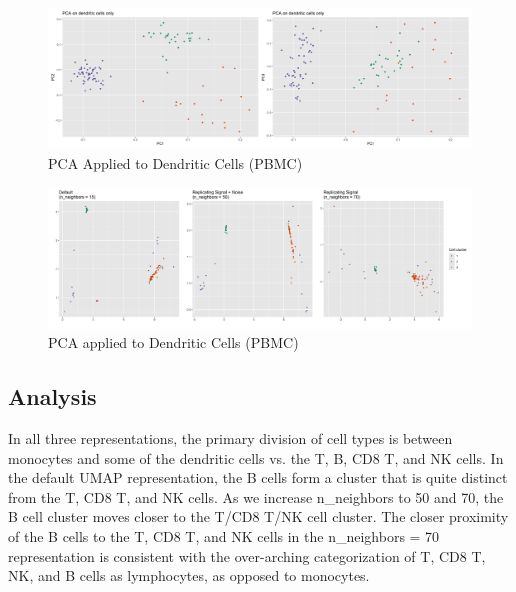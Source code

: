 \documentclass{article}
\begin{document}
\renewcommand{\thefigure}{18}
\begin{figure}[b]
\includegraphics[scale=0.22]{DC_PCA}
\centering
\caption{PCA Applied to Dendritic Cells (PBMC)}
\end{figure}

\renewcommand{\thefigure}{19}
\begin{figure}[t]
\includegraphics[scale=0.11]{DC_cluster}
\centering
\caption{PCA applied to Dendritic Cells (PBMC)}
\end{figure}

\subsection{Analysis}
In all three representations, the primary division of cell types is between monocytes and some of the dendritic cells vs. the T, B, CD8 T, and NK cells. In the default UMAP representation, the B cells form a cluster that is quite distinct from the T, CD8 T, and NK cells. As we increase n\_neighbors to 50 and 70, the B cell cluster moves closer to the T/CD8 T/NK cell cluster. The closer proximity of the B cells to the T, CD8 T, and NK cells in the n\_neighbors = 70 representation is consistent with the over-arching categorization of T, CD8 T, NK, and B cells as lymphocytes, as opposed to monocytes.
\end{document}

